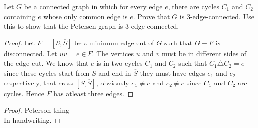 \documentclass[12pt]{article}
\newenvironment{problem}[2][Problem]{\begin{trivlist}
\item[\hskip\labelsep{\bfseries #1}\hskip\labelsep{\bfseries #2.}]}{\end{trivlist}}
\begin{document}
\begin{problem}{3}
  Let $G$ be a connected graph in which for every edge $e$, there are cycles
  $C_1$ and $C_2$ containing $e$ whose only common edge is $e$. Prove that $G$ is
  3-edge-connected.
  Use this to show that the Petersen graph is 3-edge-connected.
\end{problem}

\begin{proof}
  Let $F = [S, \overline S]$ be a minimum edge cut of $G$ such that $G - F$ is
  disconnected. Let $uv = e \in F$. The vertices $u$ and $v$ must be in
  different sides of the edge cut. We know that $e$ is in two cycles $C_1$ and
  $C_2$ such that $C_1 \triangle C_2 = {e}$ since these cycles start from $S$
  and end in $\overline S$ they must have edges $e_1$ and $e_2$ respectively,
  that cross $[S, \overline S]$, obviously $e_1 \neq e$ and $e_2 \neq e$ since
  $C_1$ and $C_2$ are cycles. Hence $F$ has atleast three edges.
\end{proof}
\begin{proof}{Peterson thing}\\
  In handwriting.
\end{proof}
\end{document}
